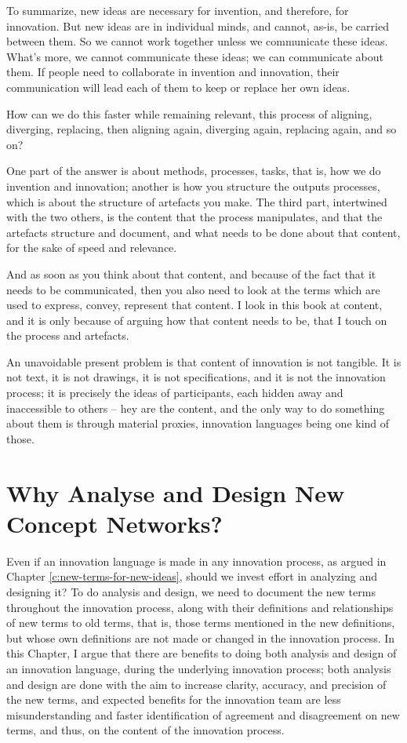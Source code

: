 \documentclass[graybox,envcountchap,sectrefs]{svmono}
\newcommand{\ncnf}{New Concept Network}
\begin{document}
To summarize, new ideas are necessary for invention, and therefore, for innovation. But new ideas are in individual minds, and cannot, as-is, be carried between them. So we cannot work together unless we communicate these ideas. What's more, we cannot communicate these ideas; we can communicate about them. If people need to collaborate in invention and innovation, their communication will lead each of them to keep or replace her own ideas. 

How can we do this faster while remaining relevant, this process of aligning, diverging, replacing, then aligning again, diverging again, replacing again, and so on? 

One part of the answer is about methods, processes, tasks, that is, how we do invention and innovation; another is how you structure the outputs processes, which is about the structure of artefacts you make. The third part, intertwined with the two others, is the content that the process manipulates, and that the artefacts structure and document, and what needs to be done about that content, for the sake of speed and relevance. 

And as soon as you think about that content, and because of the fact that it needs to be communicated, then you also need to look at the terms which are used to express, convey, represent that content. I look in this book at content, and it is only because of arguing how that content needs to be, that I touch on the process and artefacts. 

An unavoidable present problem is that content of innovation is not tangible. It is not text, it is not drawings, it is not specifications, and it is not the innovation process; it is precisely the ideas of participants, each hidden away and inaccessible to others -- hey are the content, and the only way to do something about them is through material proxies, innovation languages being one kind of those.


\printbibliography

\chapter{Why Analyse and Design \ncnf s?}
\label{c2}

Even if an innovation language is made in any innovation process, as argued in Chapter \ref{c:new-terms-for-new-ideas}, should we invest effort in analyzing and designing it? To do analysis and design, we need to document the new terms throughout the innovation process, along with their definitions and relationships of new terms to old terms, that is, those terms mentioned in the new definitions, but whose own definitions are not made or changed in the innovation process. In this Chapter, I argue that there are benefits to doing both analysis and design of an innovation language, during the underlying innovation process; both analysis and design are done with the aim to increase clarity, accuracy, and precision of the new terms, and expected benefits for the innovation team are less misunderstanding and faster identification of agreement and disagreement on new terms, and thus, on the content of the innovation process.
\end{document}
